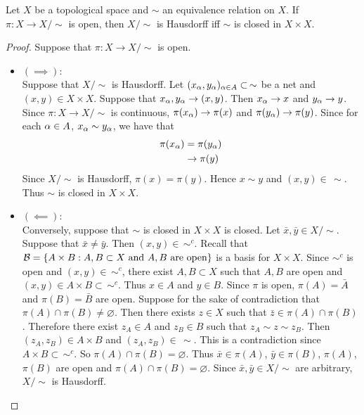 \documentclass{book}
\begin{document}
	\begin{ex}
		Let $X$ be a topological space and $\sim$ an equivalence relation on $X$. If $\pi: X \rightarrow X / \sim$ is open, then $X / \sim$ is Hausdorff iff $\sim$ is closed in $X \times X$.
	\end{ex}
	
	\begin{proof}
		Suppose that $\pi:X \rightarrow X / \sim$ is open. 
		\begin{itemize}
			\item $(\implies)$: \\
			Suppose that $X/\sim$ is Hausdorff. Let $(x_{\alpha}, y_{\alpha})_{\alpha \in A} \subset \, \sim$ be a net and $(x,y) \in X \times X$. Suppose that $x_{\alpha}, y_{\alpha} \rightarrow (x,y)$. Then $x_{\alpha} \rightarrow x$ and $y_{\alpha} \rightarrow y$. Since $\pi:X \rightarrow X / \sim$ is continuous, $\pi(x_{\alpha}) \rightarrow \pi(x)$ and $\pi(y_{\alpha}) \rightarrow \pi(y)$. Since for each $\alpha \in A$, $x_{\alpha} \sim y_{\alpha}$, we have that 
			\begin{align*}
				\pi(x_{\alpha}) 
				& = \pi(y_{\alpha})\\
				& \rightarrow \pi(y)
			\end{align*}
			Since $X/ \sim$ is Hausdorff, $\pi(x) = \pi(y)$. Hence $x \sim y$ and $(x,y) \in \, \sim$. Thus $\sim$ is closed in $X \times X$.\\
			\item $(\impliedby)$: \\
			Conversely, suppose that $\sim$ is closed in $X \times X$ is closed. Let $\bar{x}, \bar{y} \in X / \sim$. Suppose that $\bar{x} \neq \bar{y}$. Then $(x,y) \in \, \sim^c$. Recall that $\mathcal{B} =\{A \times B: A,B \subset X \text{ and $A, B$ are open} \}$ is a basis for $X \times X$. Since  $\sim^c$ is open and $(x,y) \in \, \sim^c$, there exist $A,B \subset X$ such that $A,B$ are open and $(x,y) \in A \times B \subset \, \sim^c$. Thus $x \in A$ and $y \in B$. Since $\pi$ is open, $\pi(A) = \bar{A}$ and $\pi(B) = \bar{B}$ are open. Suppose for the sake of contradiction that $\pi(A) \cap \pi(B) \neq \varnothing$. Then there exists $z \in X$ such that $\bar{z} \in \pi(A) \cap \pi(B)$. Therefore there exist $z_A \in A$ and $z_B \in B$ such that $z_A \sim z \sim z_B$. Then $(z_A, z_B) \in A \times B$ and $(z_A, z_B) \in \, \sim$. This is a contradiction since $A \times B \subset \, \sim^c$. So $\pi(A) \cap \pi(B) = \varnothing$. Thus $\bar{x} \in \pi(A)$, $\bar{y} \in \pi(B)$, $\pi(A)$, $\pi(B)$ are open and $\pi(A) \cap \pi(B) = \varnothing$. Since $\bar{x}, \bar{y} \in X / \sim$ are arbitrary, $X / \sim$ is Hausdorff.
		\end{itemize}
	\end{proof}
	
\end{document}
